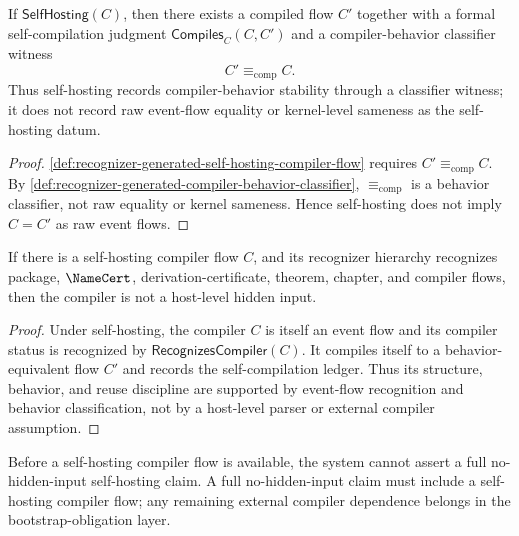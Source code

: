 \begin{proposition}
\label{prop:recognizer-generated-self-hosting-not-kernel-equality}
If $\mathsf{SelfHosting}(C)$, then there exists a compiled flow $C'$ together with a formal self-compilation judgment $\mathsf{Compiles}_C(C,C')$ and a compiler-behavior classifier witness
$$
  C'\equiv_{\mathrm{comp}}C.
$$
Thus self-hosting records compiler-behavior stability through a classifier witness; it does not record raw event-flow equality or kernel-level sameness as the self-hosting datum.
\end{proposition}

\begin{proof}
\autoref{def:recognizer-generated-self-hosting-compiler-flow} requires $C'\equiv_{\mathrm{comp}}C$. By \autoref{def:recognizer-generated-compiler-behavior-classifier}, $\equiv_{\mathrm{comp}}$ is a behavior classifier, not raw equality or kernel sameness. Hence self-hosting does not imply $C=C'$ as raw event flows.
\end{proof}

\begin{theorem}
\label{thm:recognizer-generated-self-hosting-removes-hidden-input}
If there is a self-hosting compiler flow $C$, and its recognizer hierarchy recognizes package, $\NameCert$, derivation-certificate, theorem, chapter, and compiler flows, then the compiler is not a host-level hidden input.
\end{theorem}

\begin{proof}
Under self-hosting, the compiler $C$ is itself an event flow and its compiler status is recognized by $\mathsf{RecognizesCompiler}(C)$. It compiles itself to a behavior-equivalent flow $C'$ and records the self-compilation ledger. Thus its structure, behavior, and reuse discipline are supported by event-flow recognition and behavior classification, not by a host-level parser or external compiler assumption.
\end{proof}

\begin{corollary}
\label{cor:recognizer-generated-self-hosting-or-bootstrap-boundary}
Before a self-hosting compiler flow is available, the system cannot assert a full no-hidden-input self-hosting claim. A full no-hidden-input claim must include a self-hosting compiler flow; any remaining external compiler dependence belongs in the bootstrap-obligation layer.
\end{corollary}

